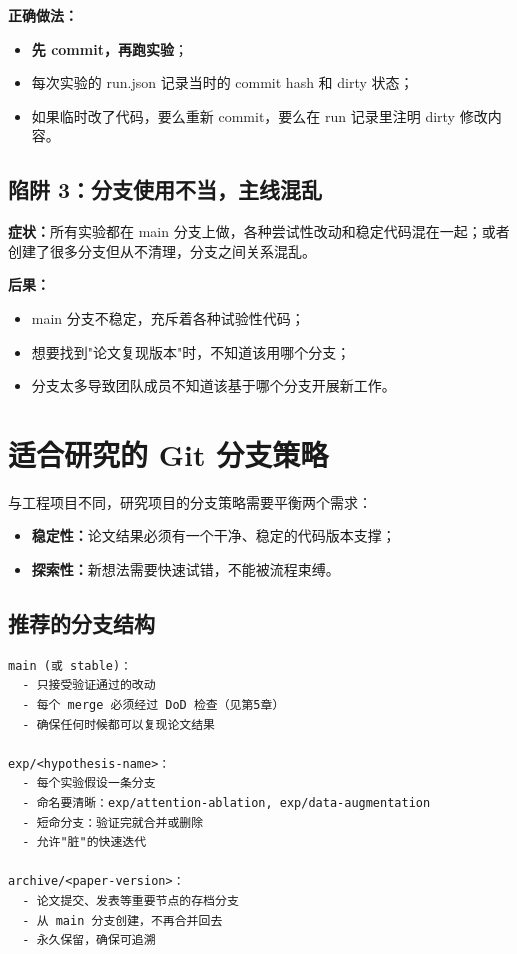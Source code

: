 \textbf{正确做法：}
\begin{itemize}
  \item \textbf{先 commit，再跑实验}；
  \item 每次实验的 run.json 记录当时的 commit hash 和 dirty 状态；
  \item 如果临时改了代码，要么重新 commit，要么在 run 记录里注明 dirty 修改内容。
\end{itemize}

\subsection{陷阱 3：分支使用不当，主线混乱}

\textbf{症状：}所有实验都在 main 分支上做，各种尝试性改动和稳定代码混在一起；或者创建了很多分支但从不清理，分支之间关系混乱。

\textbf{后果：}
\begin{itemize}
  \item main 分支不稳定，充斥着各种试验性代码；
  \item 想要找到"论文复现版本"时，不知道该用哪个分支；
  \item 分支太多导致团队成员不知道该基于哪个分支开展新工作。
\end{itemize}

\section{适合研究的 Git 分支策略}

与工程项目不同，研究项目的分支策略需要平衡两个需求：
\begin{itemize}
  \item \textbf{稳定性：}论文结果必须有一个干净、稳定的代码版本支撑；
  \item \textbf{探索性：}新想法需要快速试错，不能被流程束缚。
\end{itemize}

\subsection{推荐的分支结构}

\begin{verbatim}
main (或 stable)：
  - 只接受验证通过的改动
  - 每个 merge 必须经过 DoD 检查（见第5章）
  - 确保任何时候都可以复现论文结果

exp/<hypothesis-name>：
  - 每个实验假设一条分支
  - 命名要清晰：exp/attention-ablation, exp/data-augmentation
  - 短命分支：验证完就合并或删除
  - 允许"脏"的快速迭代

archive/<paper-version>：
  - 论文提交、发表等重要节点的存档分支
  - 从 main 分支创建，不再合并回去
  - 永久保留，确保可追溯
\end{verbatim}

